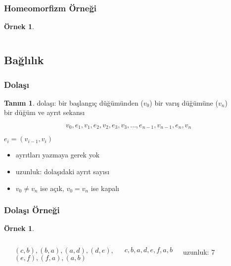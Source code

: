 \documentclass[dvipsnames]{beamer}
\theoremstyle{definition}
\newtheorem{tanim}[theorem]{Tanım}
\theoremstyle{example}
\newtheorem{ornek}[theorem]{Örnek}
\theoremstyle{plain}
\begin{document}
\begin{frame}
  \frametitle{Homeomorfizm Örneği}

  \begin{ornek}
    \begin{columns}
      \begin{center}
      \end{center}

      \begin{center}
      \end{center}
    \end{columns}
  \end{ornek}
\end{frame}

\subsection{Bağlılık}

\begin{frame}
  \frametitle{Dolaşı}

  \begin{tanim}
    \alert{dolaşı}: bir başlangıç düğümünden ($v_0$) bir varış düğümüne ($v_n$)\\
      bir düğüm ve ayrıt sekansı

    \[
      v_0,e_1,v_1,e_2,v_2,e_3,v_3,\dots,e_{n-1},v_{n-1},e_n,v_n
    \]

    $e_i=(v_{i-1},v_i)$
  \end{tanim}

  \pause
  \begin{itemize}
    \item ayrıtları yazmaya gerek yok

    \pause
    \medskip
    \item \alert{uzunluk}: dolaşıdaki ayrıt sayısı
    \item $v_0 \neq v_n$ ise \alert{açık}, $v_0 = v_n$ ise \alert{kapalı}
  \end{itemize}
\end{frame}

\begin{frame}
  \frametitle{Dolaşı Örneği}

  \begin{ornek}
    \begin{columns}
      \begin{center}
      \end{center}

      $(c,b),(b,a),(a,d),(d,e),$\\
      $(e,f),(f,a),(a,b)$

      \medskip
      $c,b,a,d,e,f,a,b$

      \bigskip
      uzunluk: 7
    \end{columns}
  \end{ornek}
\end{frame}
\end{document}
